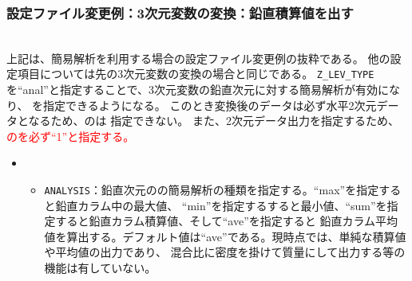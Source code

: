 \subsubsection{設定ファイル変更例：3次元変数の変換：鉛直積算値を出す}

\\

\noindent 上記は、簡易解析を利用する場合の設定ファイル変更例の抜粋である。
他の設定項目については先の3次元変数の変換の場合と同じである。
\verb|Z_LEV_TYPE|を``anal''と指定することで、3次元変数の鉛直次元に対する簡易解析が有効になり、
を指定できるようになる。
このとき変換後のデータは必ず水平2次元データとなるため、のは
指定できない。
また、2次元データ出力を指定するため、\textcolor{red}{のを必ず``1''と指定する。}

\begin{itemize}
 \item {}
 \begin{itemize}
  \item \verb|ANALYSIS|：鉛直次元のの簡易解析の種類を指定する。``max''を指定すると鉛直カラム中の最大値、
        ``min''を指定するすると最小値、``sum''を指定すると鉛直カラム積算値、そして``ave''を指定すると
        鉛直カラム平均値を算出する。デフォルト値は``ave''である。現時点では、単純な積算値や平均値の出力であり、
        混合比に密度を掛けて質量にして出力する等の機能は有していない。
 \end{itemize}
\end{itemize}

